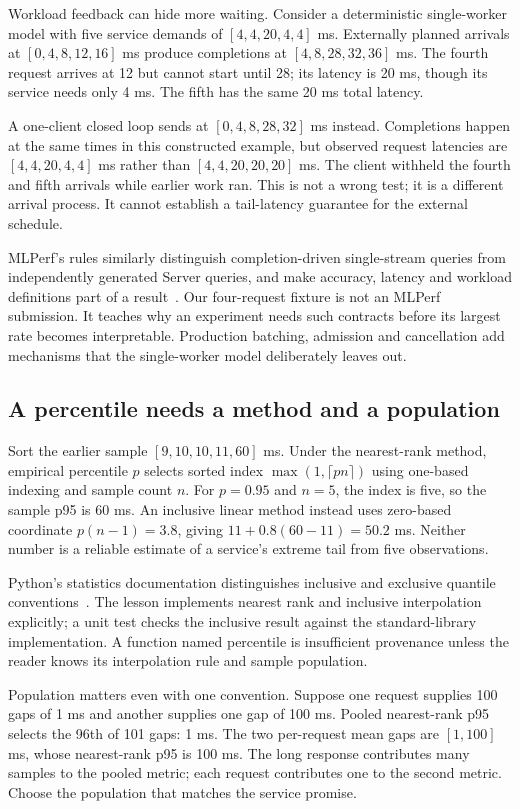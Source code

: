 Workload feedback can hide more waiting. Consider a deterministic
single-worker model with five service demands of $[4,4,20,4,4]$ ms.
Externally planned arrivals at $[0,4,8,12,16]$ ms produce completions
at $[4,8,28,32,36]$ ms. The fourth request arrives at 12 but cannot
start until 28; its latency is 20 ms, though its service needs only
4 ms. The fifth has the same 20 ms total latency.

A one-client closed loop sends at $[0,4,8,28,32]$ ms instead.
Completions happen at the same times in this constructed example,
but observed request latencies are $[4,4,20,4,4]$ ms rather than
$[4,4,20,20,20]$ ms. The client withheld the fourth and fifth arrivals
while earlier work ran. This is not a wrong test; it is a different
arrival process. It cannot establish a tail-latency guarantee for
the external schedule.

MLPerf's rules similarly distinguish completion-driven single-stream
queries from independently generated Server queries, and make accuracy,
latency and workload definitions part of a result~\cite{mlcommons2026rules}.
Our four-request fixture is not an MLPerf submission. It teaches why
an experiment needs such contracts before its largest rate becomes
interpretable. Production batching, admission and cancellation add
mechanisms that the single-worker model deliberately leaves out.

\subsection{A percentile needs a method and a population}
Sort the earlier sample $[9,10,10,11,60]$ ms. Under the nearest-rank
method, empirical percentile $p$ selects sorted index
$\max(1,\lceil pn\rceil)$ using one-based indexing and sample count $n$.
For $p=0.95$ and $n=5$, the index is five, so the sample p95 is 60 ms.
An inclusive linear method instead uses zero-based coordinate
$p(n-1)=3.8$, giving $11+0.8(60-11)=50.2$ ms.
Neither number is a reliable estimate of a service's extreme tail
from five observations.

Python's statistics documentation distinguishes inclusive and exclusive
quantile conventions~\cite{python2026statistics}. The lesson implements
nearest rank and inclusive interpolation explicitly; a unit test checks
the inclusive result against the standard-library implementation.
A function named percentile is insufficient provenance unless the
reader knows its interpolation rule and sample population.

Population matters even with one convention. Suppose one request supplies
100 gaps of 1 ms and another supplies one gap of 100 ms.
Pooled nearest-rank p95 selects the 96th of 101 gaps: 1 ms.
The two per-request mean gaps are $[1,100]$ ms, whose nearest-rank
p95 is 100 ms. The long response contributes many samples to the
pooled metric; each request contributes one to the second metric.
Choose the population that matches the service promise.

